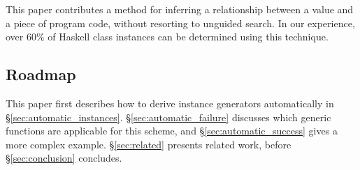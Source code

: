 \documentclass{llncs}
\begin{document}
This paper contributes a method for inferring a relationship between a value and a piece of program code, without resorting to unguided search. In our experience, over 60\% of Haskell class instances can be determined using this technique.

\subsection{Roadmap}

This paper first describes how to derive instance generators automatically in \S\ref{sec:automatic_instances}. \S\ref{sec:automatic_failure} discusses which generic functions are applicable for this scheme, and \S\ref{sec:automatic_success} gives a more complex example. \S\ref{sec:related} presents related work, before \S\ref{sec:conclusion} concludes.
\end{document}
